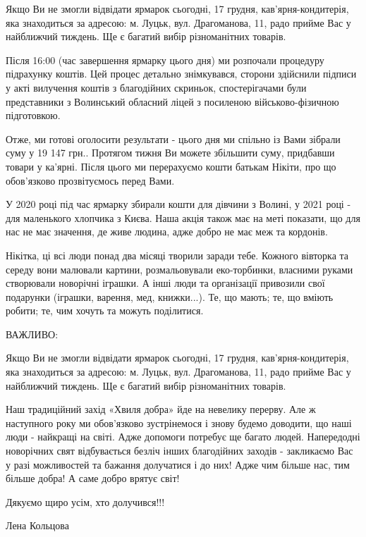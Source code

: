 \begin{zznagolos}
Якщо Ви не змогли відвідати ярмарок сьогодні, 17 грудня, кав’ярня-кондитерія,
яка знаходиться за адресою: м. Луцьк, вул. Драгоманова, 11, радо прийме Вас у
найближчий тиждень. Ще є багатий вибір різноманітних товарів.	
\end{zznagolos}

Після 16:00 (час завершення ярмарку цього дня) ми розпочали процедуру
підрахунку коштів. Цей процес детально знімкувався, сторони здійснили підписи у
акті вилучення коштів з благодійних скриньок, спостерігачами були представники
з Волинський обласний ліцей з посиленою військово-фізичною підготовкою.


Отже, ми готові оголосити результати - цього дня ми спільно із Вами зібрали
суму у 19 147 грн.. Протягом тижня Ви можете збільшити суму, придбавши товари у
ка'ярні. Після цього ми перерахуємо кошти батькам Нікіти, про що обов'язково
прозвітуємось перед Вами.

У 2020 році під час ярмарку збирали кошти для дівчини з Волині, у 2021 році -
для маленького хлопчика з Києва. Наша акція також має на меті показати, що для
нас не має значення, де живе людина, адже добро не має меж та кордонів.


Нікітка, ці всі люди понад два місяці творили заради тебе. Кожного вівторка та
середу вони малювали картини, розмальовували еко-торбинки, власними руками
створювали новорічні іграшки. А інші люди та організації привозили свої
подарунки (іграшки, варення, мед, книжки...). Те, що мають; те, що вміють
робити; те, чим хочуть та можуть поділитися.

ВАЖЛИВО:

Якщо Ви не змогли відвідати ярмарок сьогодні, 17 грудня, кав’ярня-кондитерія,
яка знаходиться за адресою: м. Луцьк, вул. Драгоманова, 11, радо прийме Вас у
найближчий тиждень. Ще є багатий вибір різноманітних товарів.


Наш традиційний захід «Хвиля добра» йде на невелику перерву. Але ж наступного
року ми обов'язково зустрінемося і знову будемо доводити, що наші люди -
найкращі на світі. Адже допомоги потребує ще багато людей. Напередодні
новорічних свят відбувається безліч інших благодійних заходів - закликаємо Вас
у разі можливостей та бажання долучатися і до них! Адже чим більше нас, тим
більше добра! А саме добро врятує світ!

Дякуємо щиро усім, хто долучився!!!

Лена Кольцова

